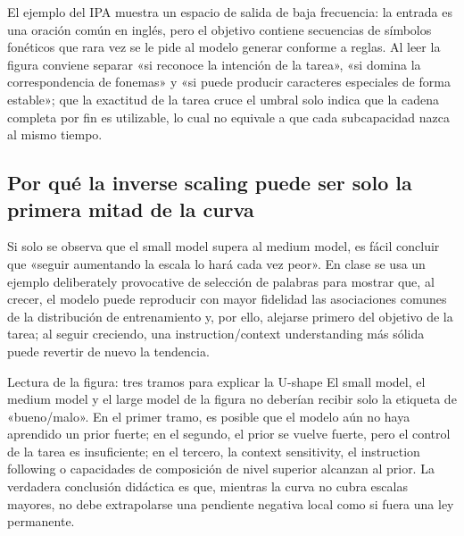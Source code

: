 
El ejemplo del IPA muestra un espacio de salida de baja frecuencia: la entrada es una oración común en inglés, pero el objetivo contiene secuencias de símbolos fonéticos que rara vez se le pide al modelo generar conforme a reglas. Al leer la figura conviene separar «si reconoce la intención de la tarea», «si domina la correspondencia de fonemas» y «si puede producir caracteres especiales de forma estable»; que la exactitud de la tarea cruce el umbral solo indica que la cadena completa por fin es utilizable, lo cual no equivale a que cada subcapacidad nazca al mismo tiempo.

\subsection{Por qué la inverse scaling puede ser solo la primera mitad de la curva}

Si solo se observa que el small model supera al medium model, es fácil concluir que «seguir aumentando la escala lo hará cada vez peor». En clase se usa un ejemplo deliberately provocative de selección de palabras para mostrar que, al crecer, el modelo puede reproducir con mayor fidelidad las asociaciones comunes de la distribución de entrenamiento y, por ello, alejarse primero del objetivo de la tarea; al seguir creciendo, una instruction/context understanding más sólida puede revertir de nuevo la tendencia.


\begin{knowledgebox}{Lectura de la figura: tres tramos para explicar la U-shape}
El small model, el medium model y el large model de la figura no deberían recibir solo la etiqueta de «bueno/malo». En el primer tramo, es posible que el modelo aún no haya aprendido un prior fuerte; en el segundo, el prior se vuelve fuerte, pero el control de la tarea es insuficiente; en el tercero, la context sensitivity, el instruction following o capacidades de composición de nivel superior alcanzan al prior. La verdadera conclusión didáctica es que, mientras la curva no cubra escalas mayores, no debe extrapolarse una pendiente negativa local como si fuera una ley permanente.
\end{knowledgebox}

